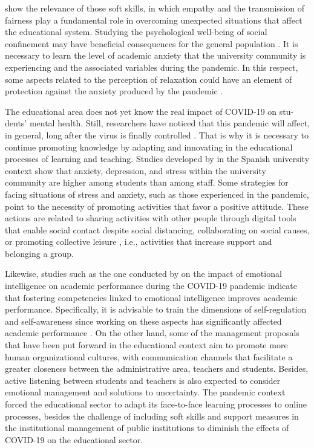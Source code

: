 \documentclass[english]{textolivre}
\begin{document}
\textcite{villafuerte_rol_2020} show the relevance of those soft skills, in which empathy and the transmission of fairness play a fundamental role in overcoming unexpected situations that affect the educational system. Studying the psychological well-being of social confinement may have beneficial consequences for the general population \cite{florencia_vela_relajacion_2020}. It is necessary to learn the level of academic anxiety that the university community is experiencing and the associated variables during the pandemic. In this respect, some aspects related to the perception of relaxation could have an element of protection against the anxiety produced by the pandemic \cite{florencia_vela_relajacion_2020}.

The educational area does not yet know the real impact of COVID-19 on stu-dents' mental health. Still, researchers have noticed that this pandemic will affect, in general, long after the virus is finally controlled \cite{de_oliveira_araujo_impact_2020}. That is why it is necessary to continue promoting knowledge by adapting and innovating in the educational processes of learning and teaching. Studies developed by \textcite{odriozola-gonzalez_psychological_2020} in the Spanish university context show that anxiety, depression, and stress within the university community are higher among students than among staff. Some strategies for facing situations of stress and anxiety, such as those experienced in the pandemic, point to the necessity of promoting activities that favor a positive attitude. These actions are related to sharing activities with other people through digital tools that enable social contact despite social distancing, collaborating on social causes, or promoting collective leisure \cite{valero_cedeno_afrontamiento_2020}, i.e., activities that increase support and belonging a group.

Likewise, studies such as the one conducted by \textcite{iqbal_effect_2021} on the impact of emotional intelligence on academic performance during the COVID-19 pandemic indicate that fostering competencies linked to emotional intelligence improves academic performance. Specifically, it is advisable to train the dimensions of self-regulation and self-awareness since working on these aspects has significantly affected academic performance \cite{iqbal_effect_2021}. On the other hand, some of the management proposals that have been put forward in the educational context \cite{montes-rodriguez_ruta_2020} aim to promote more human organizational cultures, with communication channels that facilitate a greater closeness between the administrative area, teachers and students. Besides, active listening between students and teachers is also expected to consider emotional management and solutions to uncertainty. The pandemic context forced the educational sector to adapt its face-to-face learning processes to online processes, besides the challenge of including soft skills and support measures in the institutional management of public institutions to diminish the effects of COVID-19 on the educational sector.
\end{document}
